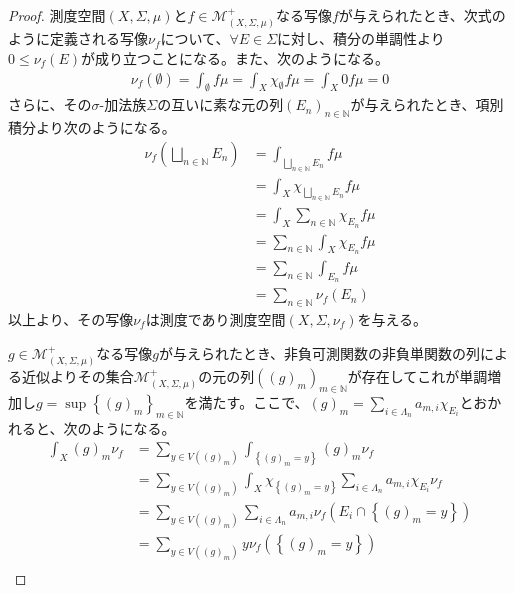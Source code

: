 \documentclass[dvipdfmx]{jsarticle}
\begin{document}
\begin{proof}
測度空間$(X,\varSigma,\mu)$と$f \in \mathcal{M}_{(X,\varSigma,\mu)}^{+}$なる写像$f$が与えられたとき、次式のように定義される写像$\nu_{f}$について、$\forall E \in \varSigma$に対し、積分の単調性より$0 \leq \nu_{f}(E)$が成り立つことになる。また、次のようになる。
\begin{align*}
\nu_{f}(\emptyset) = \int_{\emptyset} {f\mu} = \int_{X} {\chi_{\emptyset}f\mu} = \int_{X} {0f\mu} = 0
\end{align*}
さらに、その$\sigma$-加法族$\varSigma$の互いに素な元の列$\left( E_{n} \right)_{n \in \mathbb{N}}$が与えられたとき、項別積分より次のようになる。
\begin{align*}
\nu_{f}\left( \bigsqcup_{n \in \mathbb{N}} E_{n} \right) &= \int_{\bigsqcup_{n \in \mathbb{N}} E_{n}} {f\mu}\\
&= \int_{X} {\chi_{\bigsqcup_{n \in \mathbb{N}} E_{n}}f\mu}\\
&= \int_{X} {\sum_{n \in \mathbb{N}} \chi_{E_{n}}f\mu}\\
&= \sum_{n \in \mathbb{N}} {\int_{X} {\chi_{E_{n}}f\mu}}\\
&= \sum_{n \in \mathbb{N}} {\int_{E_{n}} {f\mu}}\\
&= \sum_{n \in \mathbb{N}} {\nu_{f}\left( E_{n} \right)}
\end{align*}
以上より、その写像$\nu_{f}$は測度であり測度空間$\left( X,\varSigma,\nu_{f} \right)$を与える。\par
$g \in \mathcal{M}_{(X,\varSigma,\mu)}^{+}$なる写像$g$が与えられたとき、非負可測関数の非負単関数の列による近似よりその集合$\mathcal{M}_{(X,\varSigma,\mu)}^{+}$の元の列$\left( (g)_{m} \right)_{m \in \mathbb{N}}$が存在してこれが単調増加し$g = \sup\left\{ (g)_{m} \right\}_{m \in \mathbb{N}}$を満たす。ここで、$(g)_{m} = \sum_{i \in \varLambda_{n}} {a_{m,i}\chi_{E_{i}}}$とおかれると、次のようになる。
\begin{align*}
\int_{X} {(g)_{m}\nu_{f}} &= \sum_{y \in V\left( (g)_{m} \right)} {\int_{\left\{ (g)_{m} = y \right\}} {(g)_{m}\nu_{f}}}\\
&= \sum_{y \in V\left( (g)_{m} \right)} {\int_{X} {\chi_{\left\{ (g)_{m} = y \right\}}\sum_{i \in \varLambda_{n}} {a_{m,i}\chi_{E_{i}}}\nu_{f}}}\\
&= \sum_{y \in V\left( (g)_{m} \right)} {\sum_{i \in \varLambda_{n}} {a_{m,i}\nu_{f}\left( E_{i} \cap \left\{ (g)_{m} = y \right\} \right)}}\\
&= \sum_{y \in V\left( (g)_{m} \right)} {y\nu_{f}\left( \left\{ (g)_{m} = y \right\} \right)}\\

\end{align*}
\end{proof}
\end{document}
